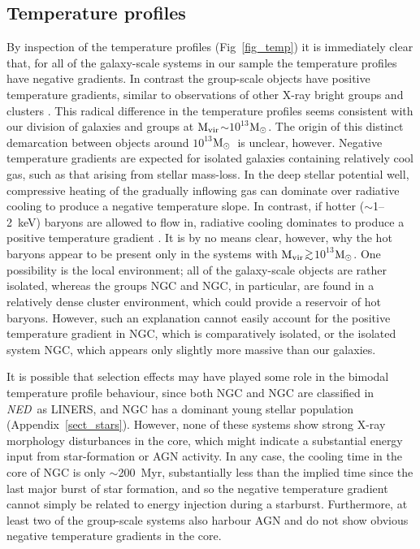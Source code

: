 \documentclass{emulateapj}
\def\spose#1{\hbox to 0pt{#1\hss}}
\def\gtsim{$\mathrel{\spose{\lower 3pt\hbox{$\sim$}} 
        \raise 2.0pt\hbox{$>$}}$\thinspace}
\def \msun {${\rm M_\odot}$}
\newcommand{\mvir}{${\rm M_{vir}}$}
\newcommand{\ned}{{\em{NED}}}
\newcommand{\thin}{\thinspace}
\begin{document}
\subsection{Temperature profiles} \label{discussion_temp}
By inspection of the temperature profiles (Fig~\ref{fig_temp}) it
is immediately clear that, for all of the galaxy-scale systems
in our sample the temperature profiles have negative gradients.
In contrast the group-scale objects have positive temperature gradients,
similar to observations of other
X-ray bright groups and clusters
\citep{gastaldello06a,vikhlinin05b,piffaretti05a}. This radical difference 
in the temperature 
profiles seems consistent with our division of galaxies and groups 
at \mvir $\sim 10^{13}$\msun.
The origin of this distinct demarcation between objects around
$10^{13}$\msun\ is unclear, however.
Negative temperature gradients are expected for
isolated galaxies containing relatively cool gas, such as that
arising from stellar mass-loss.
In the deep stellar potential well,
compressive heating of the gradually inflowing gas can dominate 
over radiative cooling to produce a negative temperature slope.
In contrast, if hotter ($\sim$1--2~keV) baryons are allowed
to flow in, radiative cooling dominates to produce a positive 
temperature gradient \citep{mathews03a}. 
It is by no means clear, however, why the hot baryons appear
to be present only in the systems with \mvir\gtsim $10^{13}$\msun.
One possibility is the local environment;
all of the galaxy-scale objects are rather isolated, whereas
the groups NGC\thin 4472 and NGC\thin 4649, in particular,
are found in a relatively dense cluster environment, which could
provide a reservoir of hot baryons. However, such an explanation
cannot easily account for the positive temperature gradient in
NGC\thin 1407, which is comparatively isolated, or the 
isolated system NGC\thin 4555, which appears 
only slightly more massive than our galaxies. 


It is possible that selection effects may have played some role in
the bimodal temperature profile behaviour, since both 
NGC\thin 4125 and NGC\thin 6482 are
classified in \ned\ as LINERS, and NGC\thin 720 has a dominant
young stellar population (Appendix~\ref{sect_stars}). 
However, none of these systems
show strong X-ray morphology disturbances in the core, 
which might indicate a substantial energy input from 
star-formation or AGN activity.
In any case, the cooling time in the core of NGC\thin 720 is only 
$\sim$200~Myr, substantially less than the 
implied time since the last major burst of star formation,
and so the negative temperature gradient cannot simply be
related to energy injection during a starburst. 
Furthermore, at least two of the group-scale
systems also harbour AGN and do not show obvious negative temperature
gradients in the core. 
\end{document}

